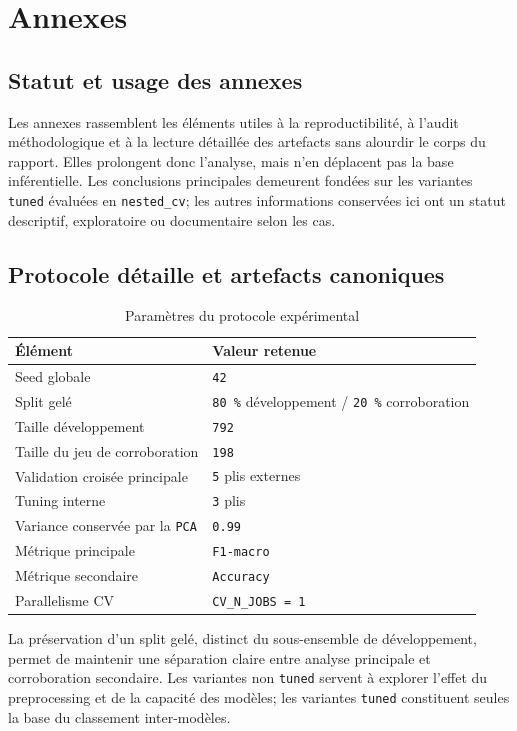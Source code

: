 \section{Annexes}

\subsection{Statut et usage des annexes}
Les annexes rassemblent les éléments utiles à la reproductibilité, à l'audit méthodologique et à la lecture détaillée des artefacts sans alourdir le corps du rapport. Elles prolongent donc l'analyse, mais n'en déplacent pas la base inférentielle. Les conclusions principales demeurent fondées sur les variantes \texttt{tuned} évaluées en \texttt{nested\_cv}; les autres informations conservées ici ont un statut descriptif, exploratoire ou documentaire selon les cas.

\subsection{Protocole détaille et artefacts canoniques}

\begin{table}[H]
\centering
\begin{tabular}{|l|l|}
\hline
\textbf{Élément} & \textbf{Valeur retenue} \\
\hline
Seed globale & \texttt{42} \\
Split gelé & \texttt{80 \%} développement / \texttt{20 \%} corroboration \\
Taille développement & \texttt{792} \\
Taille du jeu de corroboration & \texttt{198} \\
Validation croisée principale & \texttt{5} plis externes \\
Tuning interne & \texttt{3} plis \\
Variance conservée par la \texttt{PCA} & \texttt{0.99} \\
Métrique principale & \texttt{F1-macro} \\
Métrique secondaire & \texttt{Accuracy} \\
Parallelisme CV & \texttt{CV\_N\_JOBS = 1} \\
\hline
\end{tabular}
\caption{Paramètres du protocole expérimental}
\end{table}

La préservation d'un split gelé, distinct du sous-ensemble de développement, permet de maintenir une séparation claire entre analyse principale et corroboration secondaire. Les variantes non \texttt{tuned} servent à explorer l'effet du preprocessing et de la capacité des modèles; les variantes \texttt{tuned} constituent seules la base du classement inter-modèles.

